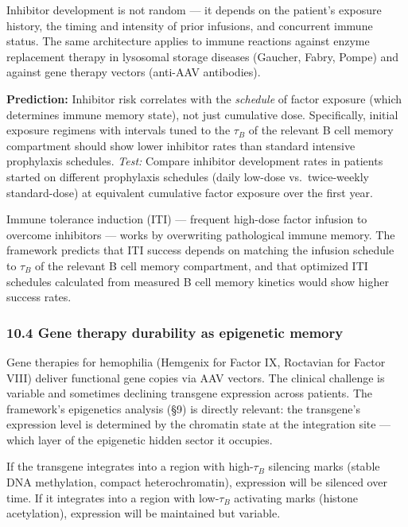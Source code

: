 \documentclass[
]{article}
\begin{document}
Inhibitor development is not random --- it depends on the patient's
exposure history, the timing and intensity of prior infusions, and
concurrent immune status. The same architecture applies to immune
reactions against enzyme replacement therapy in lysosomal storage
diseases (Gaucher, Fabry, Pompe) and against gene therapy vectors
(anti-AAV antibodies).

\textbf{Prediction:} Inhibitor risk correlates with the \emph{schedule}
of factor exposure (which determines immune memory state), not just
cumulative dose. Specifically, initial exposure regimens with intervals
tuned to the \(\tau_B\) of the relevant B cell memory compartment should
show lower inhibitor rates than standard intensive prophylaxis
schedules. \emph{Test:} Compare inhibitor development rates in patients
started on different prophylaxis schedules (daily low-dose
vs.~twice-weekly standard-dose) at equivalent cumulative factor exposure
over the first year.

Immune tolerance induction (ITI) --- frequent high-dose factor infusion
to overcome inhibitors --- works by overwriting pathological immune
memory. The framework predicts that ITI success depends on matching the
infusion schedule to \(\tau_B\) of the relevant B cell memory
compartment, and that optimized ITI schedules calculated from measured B
cell memory kinetics would show higher success rates.

\hypertarget{gene-therapy-durability-as-epigenetic-memory}{%
\subsubsection{10.4 Gene therapy durability as epigenetic
memory}\label{gene-therapy-durability-as-epigenetic-memory}}

Gene therapies for hemophilia (Hemgenix for Factor IX, Roctavian for
Factor VIII) deliver functional gene copies via AAV vectors. The
clinical challenge is variable and sometimes declining transgene
expression across patients. The framework's epigenetics analysis (§9) is
directly relevant: the transgene's expression level is determined by the
chromatin state at the integration site --- which layer of the
epigenetic hidden sector it occupies.

If the transgene integrates into a region with high-\(\tau_B\) silencing
marks (stable DNA methylation, compact heterochromatin), expression will
be silenced over time. If it integrates into a region with
low-\(\tau_B\) activating marks (histone acetylation), expression will
be maintained but variable.
\end{document}
